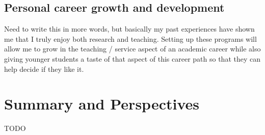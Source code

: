 \documentclass[aasms,12pt]{article}
\begin{document}
\subsection{Personal career growth and development}
Need to write this in more words, but basically my past experiences have shown me that I truly enjoy both research and teaching.
Setting up these programs will allow me to grow in the teaching / service aspect of an academic career while also giving younger students a taste of that aspect of this career path so that they can help decide if they like it.



\section{Summary and Perspectives}
\label{sct:summary}
TODO



\end{document}
